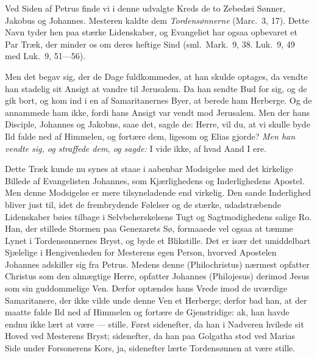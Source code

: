 \documentclass[12pt,a4paper]{book}
\begin{document}
Ved Siden af Petrus finde vi i denne udvalgte Kreds de to Zebedæi Sønner, Jakobus og
Johannes. Mesteren kaldte dem \emph{Tordensønnerne} (Marc.\ 3, 17). Dette Navn tyder hen
paa stærke Lidenskaber, og Evangeliet har ogsaa opbevaret et Par Træk, der minder os om
deres heftige Sind (sml.\ Mark.\ 9, 38. Luk.\ 9, 49 med Luk.\ 9, 51---56).

Men det begav sig, der de Dage fuldkommedes, at han skulde optages, da vendte han stadelig
sit Ansigt at vandre til Jerusalem. Da han sendte Bud for sig, og de gik bort, og kom ind i
en af Samaritanernes Byer, at berede ham Herberge. Og de annammede ham ikke, fordi hans
Ansigt var vendt mod Jerusalem. Men der hans Disciple, Johannes og Jakobns, saae det, sagde
de: {\large Herre, vil du, at vi skulle byde Ild falde ned af Himmelen, og fortære dem,
ligesom og Elias gjorde?} \emph{Men han
vendte sig, og straffede dem, og sagde:} {\large I vide ikke, af hvad Aand I ere.}

Dette Træk kunde nu synes at staae i aabenbar Modsigelse med det kirkelige Billede af
Evangelisten Johannes, som Kjærlighedens og Inderlighedens Apostel. Men denne Modsigelse er
mere tilsyneladende end virkelig. Den sande Inderlighed bliver just til, idet de
frembrydende Følelser og de stærke, udadstræbende Lidenskaber bøies tilbage i
Selvbeherskelsens Tugt og Sagtmodighedens salige Ro. Han, der stillede Stormen paa
Genezarets Sø, formaaede vel ogsaa at tæmme Lynet i Tordensønnernes Bryst, og byde et
Blikstille. Det er især det umiddelbart Sjælelige i Hengivenheden for Mesterens egen
Person, hvorved Apostelen Johannes adskiller sig fra Petrus. Medens denne (Philochristus)
nærmest opfatter Christus som den almægtige Herre, opfatter Johannes (Philojesus) derimod
Jesus som sin guddommelige Ven. Derfor optændes hans Vrede imod de uværdige Samaritanere,
der ikke vilde unde denne Ven et Herberge; derfor bad han, at der maatte falde Ild ned af
Himmelen og fortære de Gjenstridige: ak, han havde endnu ikke lært at være --- stille.
Først sidenefter, da han i Nadveren hvilede sit Hoved ved Mesterens Bryst; sidenefter, da
han paa Golgatha stod ved Marias Side under Forsonerens Kors, ja, sidenefter lærte
Tordensønnen at være stille.
\end{document}
